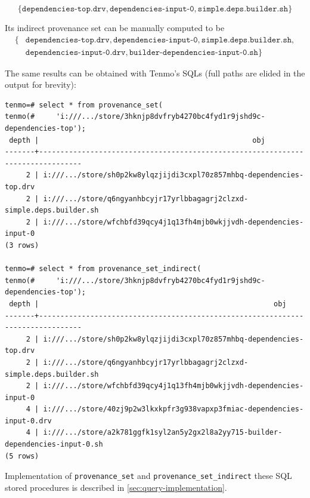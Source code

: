 \[ \{ \texttt{dependencies-top.drv}, \texttt{dependencies-input-0}, \texttt{simple.deps.builder.sh} \} \]

Its indirect provenance set can be manually computed to be
\begin{equation*}
\begin{split}
\{ & \texttt{dependencies-top.drv}, \texttt{dependencies-input-0}, \texttt{simple.deps.builder.sh}, \\ 
   & \texttt{dependencies-input-0.drv}, \texttt{builder-dependencies-input-0.sh} \} 
\end{split}
\end{equation*}

\bigskip

The same results can be obtained with Tenmo's SQLs (full paths are elided in the output for brevity):
%
\begin{verbatim}
tenmo=# select * from provenance_set(
tenmo(#     'i:///.../store/3hknjp8dvfryb4270bc4fyd1r9jshd9c-dependencies-top');
 depth |                                                  obj                                                   
-------+--------------------------------------------------------------------------------
     2 | i:///.../store/sh0p2kw8ylqzjijdi3cxpl70z857mhbq-dependencies-top.drv
     2 | i:///.../store/q6ngyanhbcyjr17yrlbbagagrj2clzxd-simple.deps.builder.sh
     2 | i:///.../store/wfchbfd39qcy4j1q13fh4mjb0wkjjvdh-dependencies-input-0
(3 rows)

tenmo=# select * from provenance_set_indirect(
tenmo(#     'i:///.../store/3hknjp8dvfryb4270bc4fyd1r9jshd9c-dependencies-top');
 depth |                                                       obj                                                       
-------+--------------------------------------------------------------------------------
     2 | i:///.../store/sh0p2kw8ylqzjijdi3cxpl70z857mhbq-dependencies-top.drv
     2 | i:///.../store/q6ngyanhbcyjr17yrlbbagagrj2clzxd-simple.deps.builder.sh
     2 | i:///.../store/wfchbfd39qcy4j1q13fh4mjb0wkjjvdh-dependencies-input-0
     4 | i:///.../store/40zj9p2w3lkxkpfr3g938vapxp3fmiac-dependencies-input-0.drv
     4 | i:///.../store/a2k781ggfk1syl2an5y2gx2l8a2yy715-builder-dependencies-input-0.sh
(5 rows)
\end{verbatim}

Implementation of \texttt{provenance\_set} and \texttt{provenance\_set\_indirect} these SQL stored procedures is described in \cref{sec:query-implementation}. 


